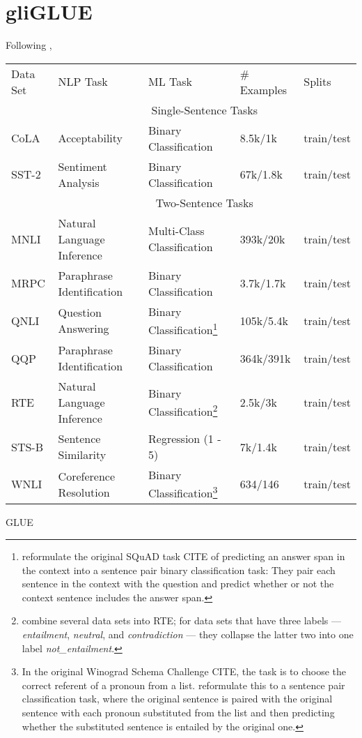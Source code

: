 
\label{chap:5_dataset}

\section{gliGLUE}

Following \cite{wang2018glue}, 

{\begin{tabular}{l|llll}
	Data Set & NLP Task & ML Task & \# Examples & Splits \\
	\hhline{=|====}
	& \multicolumn{4}{|c}{Single-Sentence Tasks} \\
	CoLA &  Acceptability & Binary Classification & 8.5k/1k & train/test \\
	SST-2 & Sentiment Analysis & Binary Classification & 67k/1.8k & train/test \\
	\hline
	& \multicolumn{4}{|c}{Two-Sentence Tasks} \\
	MNLI & Natural Language Inference & Multi-Class Classification &  393k/20k & train/test \\
	MRPC & Paraphrase Identification & Binary Classification & 3.7k/1.7k & train/test \\
	QNLI & Question Answering & Binary Classification\footnote{\cite{wang2018glue} reformulate the original SQuAD task CITE of predicting an answer span in the context into a sentence pair binary classification task: They pair each sentence in the context with the question and predict whether or not the context sentence includes the answer span.} &  105k/5.4k & train/test \\
	QQP & Paraphrase Identification & Binary Classification &  364k/391k & train/test \\
	RTE & Natural Language Inference & Binary Classification\footnote{\cite{wang2018glue} combine several data sets into RTE; for data sets that have three labels --- \emph{entailment}, \emph{neutral}, and \emph{contradiction} --- they collapse the latter two into one label \emph{not\_entailment}.} &  2.5k/3k & train/test \\
	STS-B & Sentence Similarity & Regression (1 - 5) & 7k/1.4k & train/test \\
	WNLI & Coreference Resolution & Binary Classification\footnote{In the original Winograd Schema Challenge CITE, the task is to choose the correct referent of a pronoun from a list. \cite{wang2018glue} reformulate this to a sentence pair classification task, where the original sentence is paired with the original sentence with each pronoun substituted from the list and then predicting whether the substituted sentence is entailed by the original one.} &  634/146 & train/test \\
\end{tabular}
}{GLUE}



